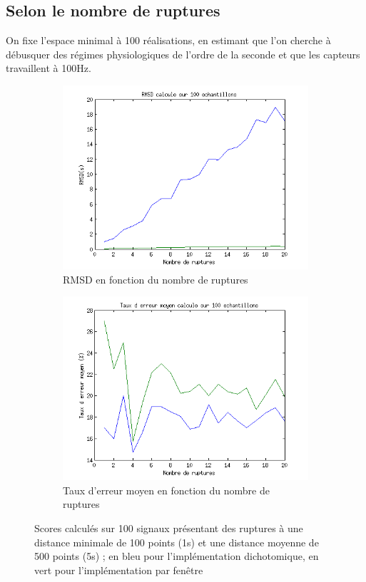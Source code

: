 \documentclass[french,11pt,notitlepage]{report}
\begin{document}
	
	\subsection{Selon le nombre de ruptures}
	
	
	On fixe l'espace minimal à 100 réalisations, en estimant que l'on cherche à débusquer des régimes physiologiques de l'ordre de la seconde et que les capteurs travaillent à 100Hz.

	
	
		\begin{figure}[ht]
		\begin{subfigure}[t]{.49\textwidth}
		  \includegraphics[width=\linewidth,height=.18\textheight]{rmsd_rupt}
			\caption{RMSD en fonction du nombre de ruptures}
			\label{}
		\end{subfigure}
		\hfill
		\begin{subfigure}[t]{.49\textwidth}
			\includegraphics[width=\linewidth,height=.18\textheight]{erratemean_rupt}
			\caption{Taux d'erreur moyen en fonction du nombre de ruptures}
			\label{}
		\end{subfigure}
	\caption{Scores calculés sur 100 signaux présentant des ruptures à une distance minimale de 100 points (1s) et une distance moyenne de 500 points (5s) ; en bleu pour l'implémentation dichotomique, en vert pour l'implémentation par fenêtre}
	\label{score_rupt}
	\end{figure}
\end{document}
